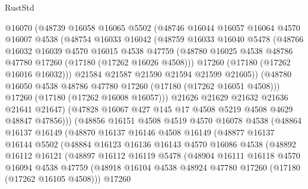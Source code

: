 \begin{lexlean}{RustStd}
\begin{coremodule}
{\begin{coremodule}
{{{{{{{{{{{{{{{{{{{{{{{{{{{{{{{{{{{{{{{{{{{{{{{{{{{{{{{              @16070
              (@48739
                @16058
                @16065
                @5502
                (@48746
                  @16044
                  @16057
                  @16064
                  @4570
                  @16007
                  @4538
                  (@48754
                    @16033
                    @16042
                    (@48759
                      @16033
                      @16040
                      @5478
                      (@48766
                        @16032
                        @16039
                        @4570
                        @16015
                        @4538
                        @47759
                        (@48780 @16025 @4538 @48786 @47780 @17260 (@17180 (@17262 @16026 @4508)))
                        @17260
                        (@17180 (@17262 @16016 @16032)))
                      @21584
                      @21587
                      @21590
                      @21594
                      @21599
                      @21605))
                  (@48780 @16050 @4538 @48786 @47780 @17260 (@17180 (@17262 @16051 @4508)))
                  @17260
                  (@17180 (@17262 @16008 @16057)))
                @21626
                @21629
                @21632
                @21636
                @21641
                @21647)
              (@47828 @16067 @427 @145 @17 @4508 @5219 @4508 @4629 @48847 @47856)))
          (@48856
            @16151
            @4508
            @4519
            @4570
            @16078
            @4538
            (@48864
              @16137
              @16149
              (@48870
                @16137
                @16146
                @4508
                @16149
                (@48877
                  @16137
                  @16144
                  @5502
                  (@48884
                    @16123
                    @16136
                    @16143
                    @4570
                    @16086
                    @4538
                    (@48892
                      @16112
                      @16121
                      (@48897
                        @16112
                        @16119
                        @5478
                        (@48904
                          @16111
                          @16118
                          @4570
                          @16094
                          @4538
                          @47759
                          (@48918 @16104 @4538 @48924 @47780 @17260 (@17180 (@17262 @16105 @4508)))
                          @17260
}}}}}}}}}}}}}}}}}}}}}}}}}}}}}}}}}}}}}}}}}}}}}}}}}}}}}}}
\end{coremodule}}
\end{coremodule}
\end{lexlean}

